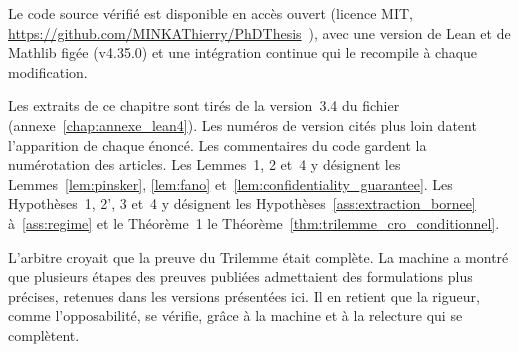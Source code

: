 \begin{sloppypar}
Le code source v\'erifi\'e est disponible en acc\`es ouvert (licence MIT,
\url{https://github.com/MINKAThierry/PhDThesis}~\cite{CROTrilemmaDepot}), avec une
version de Lean et de Mathlib fig\'ee (v4.35.0) et une int\'egration continue qui le
recompile \`a chaque modification.

Les extraits de ce chapitre sont tir\'es de la version~3.4 du fichier
(annexe~\ref{chap:annexe_lean4}). Les num\'eros de version cit\'es plus loin datent l'apparition de
chaque \'enonc\'e. Les commentaires du code gardent la num\'erotation des articles. Les Lemmes~1,
2 et~4 y d\'esignent les Lemmes~\ref{lem:pinsker}, \ref{lem:fano}
et~\ref{lem:confidentiality_guarantee}. Les Hypoth\`eses~1, 2', 3 et~4 y d\'esignent les
Hypoth\`eses~\ref{ass:extraction_bornee} \`a~\ref{ass:regime} et le Th\'eor\`eme~1 le
Th\'eor\`eme~\ref{thm:trilemme_cro_conditionnel}.
\end{sloppypar}

\begin{boiteArbitre}
L'arbitre croyait que la preuve du Trilemme \'etait compl\`ete. La machine a
montr\'e que plusieurs \'etapes des preuves publi\'ees admettaient des formulations
plus pr\'ecises, retenues dans les versions pr\'esent\'ees ici. Il en retient
que la rigueur, comme l'opposabilit\'e, se v\'erifie, gr\^ace \`a la machine et \`a
la relecture qui se compl\`etent.
\end{boiteArbitre}

